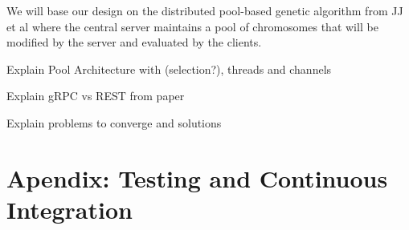 We will base our design on the distributed pool-based genetic algorithm from JJ et al \cite{paper-pool-jj} where the central server maintains a pool of chromosomes that will be modified by the server and evaluated by the clients.

Explain Pool Architecture with (selection?), threads and channels

Explain gRPC vs REST from paper

Explain problems to converge and solutions








































\section{Apendix: Testing and Continuous Integration}